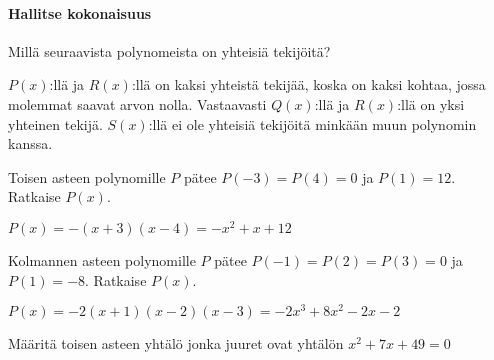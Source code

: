 \begin{tehtavasivu}
\paragraph*{Hallitse kokonaisuus}

\begin{tehtava}
    Millä seuraavista polynomeista on yhteisiä tekijöitä?

    \begin{kuvaajapohja}{1.5}{-1.5}{2.5}{-3.5}{1.5}
    \end{kuvaajapohja}
    \begin{vastaus}
	$P(x)$:llä ja $R(x)$:llä on kaksi yhteistä tekijää, koska on kaksi kohtaa, jossa molemmat saavat arvon nolla. Vastaavasti $Q(x)$:llä ja $R(x)$:llä
	on yksi yhteinen tekijä. $S(x)$:llä ei ole yhteisiä tekijöitä minkään muun polynomin kanssa.
    \end{vastaus}
\end{tehtava}

\begin{tehtava}
    Toisen asteen polynomille $P$ pätee $P(-3)=P(4)=0$ ja $P(1)=12$. Ratkaise $P(x)$.
    \begin{vastaus}
        $P(x)=-(x+3)(x-4)=-x^2+x+12$
    \end{vastaus}
\end{tehtava}

\begin{tehtava}
    Kolmannen asteen polynomille $P$ pätee $P(-1)=P(2)=P(3)=0$ ja $P(1)=-8$. Ratkaise $P(x)$.
    \begin{vastaus}
        $P(x)=-2(x+1)(x-2)(x-3)=-2x^3+8x^2-2x-2$
    \end{vastaus}
\end{tehtava}

\begin{tehtava}
   Määritä toisen asteen yhtälö jonka juuret ovat yhtälön $ x^2+7x+49 =0 $ 
 \begin{alakohdat}
    \end{alakohdat}
    \begin{vastaus}
        \begin{alakohdat}
        \end{alakohdat}
    \end{vastaus}
\end{tehtava}


\end{tehtavasivu}

